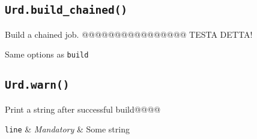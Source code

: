 \subsection{\texttt{Urd.build\_chained()}}
Build a chained job. @@@@@@@@@@@@@@@@  TESTA DETTA!
\begin{leftbar}
Same options as \texttt{build}
\end{leftbar}


\subsection{\texttt{Urd.warn()}}
Print a string after successful build@@@@
\begin{leftbar}
\starttable
\texttt{line} & \textsl{Mandatory} & Some string\\
\stoptable
\end{leftbar}
